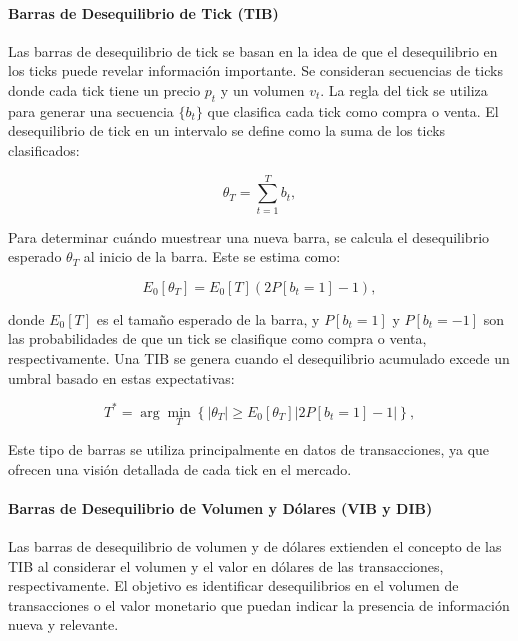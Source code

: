 \documentclass[a4paper,12pt, twoside]{report}
\begin{document}
\paragraph{Barras de Desequilibrio de Tick (TIB)}

Las barras de desequilibrio de tick se basan en la idea de que el desequilibrio en los ticks puede revelar información 
importante. Se consideran secuencias de ticks donde cada tick tiene un precio \(p_t\) y un volumen \(v_t\). La regla del tick 
se utiliza para generar una secuencia \(\{b_t\}\) que clasifica cada tick como compra o venta. El desequilibrio de tick en un 
intervalo se define como la suma de los ticks clasificados:

\begin{equation}
\theta_T = \sum_{t=1}^{T} b_t,
\end{equation}

Para determinar cuándo muestrear una nueva barra, se calcula el desequilibrio esperado \(\theta_T\) al inicio de la barra. 
Este se estima como:

\begin{equation}
E_0[\theta_T] = E_0[T](2P[b_t = 1] - 1),
\end{equation}

donde \(E_0[T]\) es el tamaño esperado de la barra, y \(P[b_t = 1]\) y \(P[b_t = -1]\) son las probabilidades de que un tick 
se clasifique como compra o venta, respectivamente. Una TIB se genera cuando el desequilibrio acumulado excede un umbral basado 
en estas expectativas:

\begin{equation}
T^* = \arg \min_T \left\{  | \theta_T | \geq E_0[\theta_T] |2P[b_t = 1] - 1 | \right\},
\end{equation}

Este tipo de barras se utiliza principalmente en datos de transacciones, ya que ofrecen una visión detallada de cada tick 
en el mercado.

\paragraph{Barras de Desequilibrio de Volumen y Dólares (VIB y DIB)}

Las barras de desequilibrio de volumen y de dólares extienden el concepto de las TIB al considerar el volumen 
y el valor en dólares de las transacciones, respectivamente. El objetivo es identificar desequilibrios en el volumen de 
transacciones o el valor monetario que puedan indicar la presencia de información nueva y relevante.
\end{document}

